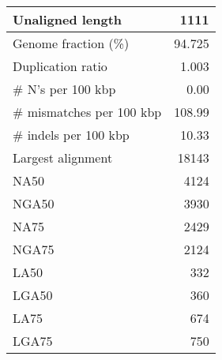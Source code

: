 \documentclass[12pt,a4paper]{article}
\begin{document}
\begin{table}[ht]
\begin{center}
\begin{tabular}{|l*{1}{|r}|}
Unaligned length & 1111 \\ \hline
Genome fraction (\%) & 94.725 \\ \hline
Duplication ratio & 1.003 \\ \hline
\# N's per 100 kbp & 0.00 \\ \hline
\# mismatches per 100 kbp & 108.99 \\ \hline
\# indels per 100 kbp & 10.33 \\ \hline
Largest alignment & 18143 \\ \hline
NA50 & 4124 \\ \hline
NGA50 & 3930 \\ \hline
NA75 & 2429 \\ \hline
NGA75 & 2124 \\ \hline
LA50 & 332 \\ \hline
LGA50 & 360 \\ \hline
LA75 & 674 \\ \hline
LGA75 & 750 \\ \hline
\end{tabular}
\end{center}
\end{table}
\end{document}
